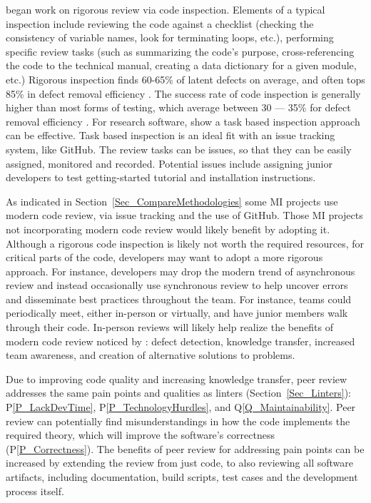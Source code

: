 \documentclass[final, 12pt, 3p, times]{elsarticle}
\newcommand{\ppref}[1]{P\ref{#1}}
\newcommand{\qref}[1]{Q\ref{#1}}
\begin{document}
\cite{Fagan1976} began work on rigorous review via code inspection.  Elements
of a typical inspection include reviewing the code against a checklist (checking
the consistency of variable names, look for terminating loops, etc.), performing
specific review tasks (such as summarizing the code's purpose, cross-referencing
the code to the technical manual, creating a data dictionary for a given module,
etc.) Rigorous inspection finds 60-65\% of latent defects on average, and often
tops 85\% in defect removal efficiency \cite{Jones2008}. The success rate of
code inspection is generally higher than most forms of testing, which average
between 30 --- 35\% for defect removal efficiency \cite{EbertAndJones2009,
Jones2008}. For research software, \cite{KellyAndShepard2000} show a task based
inspection approach can be effective. Task based inspection is an ideal fit with
an issue tracking system, like GitHub.  The review tasks can be issues, so that
they can be easily assigned, monitored and recorded. Potential issues include
assigning junior developers to test getting-started tutorial and installation
instructions.

As indicated in Section~\ref{Sec_CompareMethodologies} some MI projects use
modern code review, via issue tracking and the use of GitHub.  Those MI projects
not incorporating modern code review would likely benefit by adopting it.
Although a rigorous code inspection is likely not worth the required resources,
for critical parts of the code, developers may want to adopt a more rigorous
approach. For instance, developers may drop the modern trend of
asynchronous review and instead occasionally use synchronous review to help
uncover errors and disseminate best practices throughout the team.  For
instance, teams could periodically meet, either in-person or virtually, and have
junior members walk through their code.  In-person reviews will likely help
realize the benefits of modern code review noticed by
\cite{BirdAndBacchelli2013}: defect detection, knowledge transfer, increased
team awareness, and creation of alternative solutions to problems.

Due to improving code quality and increasing knowledge transfer, peer review
addresses the same pain points and qualities as linters
(Section~\ref{Sec_Linters}): \ppref{P_LackDevTime}, \ppref{P_TechnologyHurdles},
and \qref{Q_Maintainability}. Peer review can potentially find misunderstandings
in how the code implements the required theory, which will improve the
software's correctness (\ppref{P_Correctness}). The benefits of peer review for
addressing pain points can be increased by extending the review from just code,
to also reviewing all software artifacts, including documentation, build
scripts, test cases and the development process itself.
\end{document}
